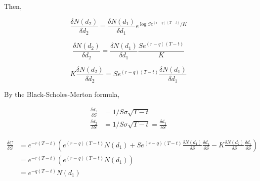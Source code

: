 \documentclass[11pt]{scrartcl}
\newcommand{\defrac}[2]{\ensuremath{\frac{\delta #1}{\delta #2}}}
\renewcommand{\sf}{\ensuremath{Se^{(r-q)(T-t)}}}
\begin{document}
Then,

\[\defrac{N(d_2)}{d_2} = \defrac{N(d_1)}{d_1} e^{\log{\sf/K}}\]

\[\defrac{N(d_2)}{d_2} = \defrac{N(d_1)}{d_1} \frac{\sf}{K}\]

\[K\defrac{N(d_2)}{d_2} = \sf\defrac{N(d_1)}{d_1}\]

By the Black-Scholes-Merton formula,

\begin{align*}
\defrac{d_1}{S} &= 1/S\sigma\sqrt{T-t} \\
\defrac{d_2}{S} &= 1/S\sigma\sqrt{T-t} = \defrac{d_1}{S}
\end{align*}

\begin{align*}
\defrac{C}{S} &= e^{-r(T-t)}\left(e^{(r-q)(T-t)}N(d_1) + Se^{(r-q)(T-t)}\defrac{N(d_1)}{S}\defrac{d_1}{S} - K\defrac{N(d_2)}{S}\defrac{d_2}{S} \right) \\
&=e^{-r(T-t)}\left(e^{(r-q)(T-t)}N(d_1) \right) \\
&= e^{-q(T-t)}N(d_1)
\end{align*}
\end{document}
